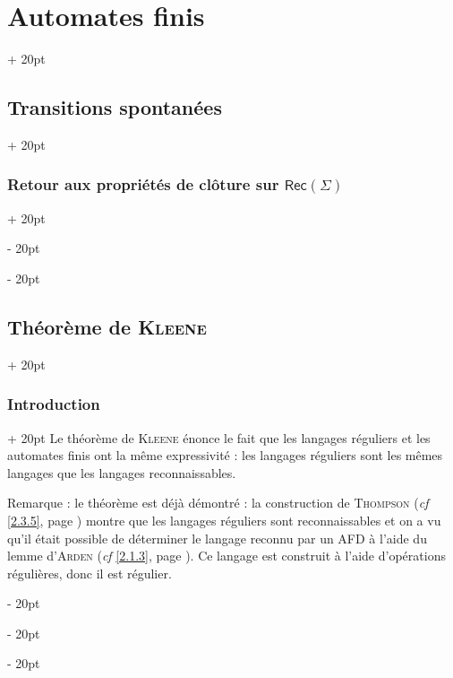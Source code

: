 \documentclass[a4paper, 12pt, twoside]{article}
\newcommand{\lr}[1]{\left( #1 \right)}
\newcommand{\ind}[1][20pt]{\advance\leftskip + #1}
\newcommand{\deind}[1][20pt]{\advance\leftskip - #1}
\newenvironment{indt}[2][20pt]{#2 \par \ind[#1]}{\par \deind} %
\newcommand{\Rec}[1]{\mathsf{Rec}\!\lr{#1}}
\begin{document}
\begin{indt}{\section{Automates finis}}
\begin{indt}{\subsection{Transitions spontanées}}
\begin{indt}{\subsubsection{Retour aux propriétés de clôture sur $\Rec \Sigma$}}
\begin{center}
                \end{center}
            \end{indt}
        \end{indt}

        \vspace{12pt}
        
        \begin{indt}{\subsection{Théorème de \textsc{Kleene}}}
            \label{2.4}

            \begin{indt}{\subsubsection{Introduction}}
                Le théorème de \textsc{Kleene} énonce le fait que les langages réguliers et les automates finis ont la même expressivité : les langages réguliers sont les mêmes langages que les langages reconnaissables.

                \vspace{12pt}
                
                Remarque : le théorème est déjà démontré : la construction de \textsc{Thompson} (\textit{cf} \ref{2.3.5}, page \pageref{2.3.5}) montre que les langages réguliers sont reconnaissables et on a vu qu'il était possible de déterminer le langage reconnu par un AFD à l'aide du lemme d'\textsc{Arden} (\textit{cf} \ref{2.1.3}, page \pageref{2.1.3}).
                Ce langage est construit à l'aide d'opérations régulières, donc il est régulier.


\end{indt}
\end{indt}
\end{indt}
\end{document}
